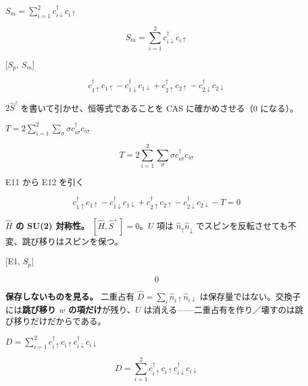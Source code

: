 \documentclass[dvipdfmx,a4paper,11pt]{jsarticle}
\begin{document}
$S_m = \sum_{i=1}^{2} c^\dagger_{i\downarrow} c_{i\uparrow}$

\begin{equation}
  S_m = \sum_{i=1}^{2} c^\dagger_{i\downarrow} c_{i\uparrow}
  \label{eq:E10}
\end{equation}

[$S_p$, $S_m$]

\begin{equation}
  {c}_{1{\uparrow}}^{\dagger} {c}_{1{\uparrow}} - {c}_{1{\downarrow}}^{\dagger} {c}_{1{\downarrow}} + {c}_{2{\uparrow}}^{\dagger} {c}_{2{\uparrow}} - {c}_{2{\downarrow}}^{\dagger} {c}_{2{\downarrow}}
  \label{eq:E11}
\end{equation}

$2\hat S^z$ を書いて引かせ、恒等式であることを CAS に確かめさせる（0 になる）。

$T = 2 \sum_{i=1}^{2} \sum_{\sigma} \sigma c^\dagger_{i\sigma} c_{i\sigma}$

\begin{equation}
  T = 2 \sum_{i=1}^{2} \sum_{\sigma} \sigma c^\dagger_{i\sigma} c_{i\sigma}
  \label{eq:E12}
\end{equation}

E11 から E12 を引く

\begin{equation}
  {c}_{1{\uparrow}}^{\dagger} {c}_{1{\uparrow}} - {c}_{1{\downarrow}}^{\dagger} {c}_{1{\downarrow}} + {c}_{2{\uparrow}}^{\dagger} {c}_{2{\uparrow}} - {c}_{2{\downarrow}}^{\dagger} {c}_{2{\downarrow}} - T = 0
  \label{eq:E13}
\end{equation}

\textbf{$\hat H$ の SU(2) 対称性。} $[\hat H,\hat S^+]=0$。$U$ 項は $\hat n_\uparrow\hat n_\downarrow$ でスピンを反転させても不変、跳び移りはスピンを保つ。

[E1, $S_p$]

\begin{equation}
  0
  \label{eq:E14}
\end{equation}

\textbf{保存しないものを見る。} 二重占有 $\hat D=\sum_i\hat n_{i\uparrow}\hat n_{i\downarrow}$ は保存量ではない。交換子には\textbf{跳び移り $w$ の項だけ}が残り、$U$ は消える——二重占有を作り／壊すのは跳び移りだけだからである。

$D = \sum_{i=1}^{2} c^\dagger_{i\uparrow} c_{i\uparrow} c^\dagger_{i\downarrow} c_{i\downarrow}$

\begin{equation}
  D = \sum_{i=1}^{2} c^\dagger_{i\uparrow} c_{i\uparrow} c^\dagger_{i\downarrow} c_{i\downarrow}
  \label{eq:E15}
\end{equation}
\end{document}
